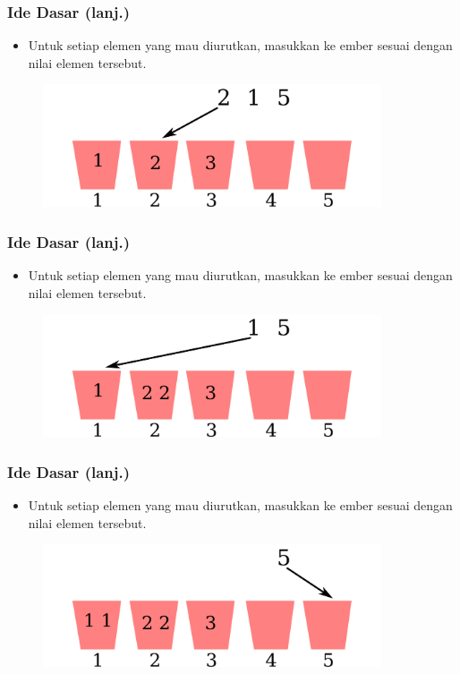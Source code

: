 \begin{frame}
\frametitle{Ide Dasar (lanj.)}
  \begin{itemize}
    \item Untuk setiap elemen yang mau diurutkan, masukkan ke ember
    sesuai dengan nilai elemen tersebut.
  \end{itemize}
  \begin{figure}
    \includegraphics[width=10cm]{asset/counting-sort-5.pdf}
  \end{figure}
\end{frame}

\begin{frame}
\frametitle{Ide Dasar (lanj.)}
  \begin{itemize}
    \item Untuk setiap elemen yang mau diurutkan, masukkan ke ember
    sesuai dengan nilai elemen tersebut.
  \end{itemize}
  \begin{figure}
    \includegraphics[width=10cm]{asset/counting-sort-6.pdf}
  \end{figure}
\end{frame}

\begin{frame}
\frametitle{Ide Dasar (lanj.)}
  \begin{itemize}
    \item Untuk setiap elemen yang mau diurutkan, masukkan ke ember
    sesuai dengan nilai elemen tersebut.
  \end{itemize}
  \begin{figure}
    \includegraphics[width=10cm]{asset/counting-sort-7.pdf}
  \end{figure}
\end{frame}


